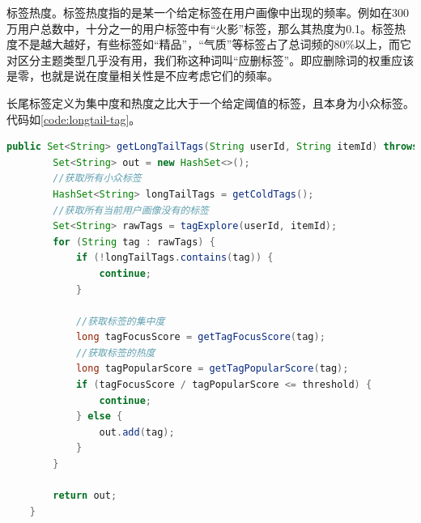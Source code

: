   标签热度。标签热度指的是某一个给定标签在用户画像中出现的频率。例如在300万用户总数中，十分之一的用户标签中有“火影”标签，那么其热度为0.1。标签热度不是越大越好，有些标签如“精品”，“气质”等标签占了总词频的80\%以上，而它对区分主题类型几乎没有用，我们称这种词叫“应删标签”。即应删除词的权重应该是零，也就是说在度量相关性是不应考虑它们的频率。

  长尾标签定义为集中度和热度之比大于一个给定阈值的标签，且本身为小众标签。代码如\autoref{code:longtail-tag}。
  \begin{lstlisting}[language=java,firstnumber=1,label={code:longtail-tag}, caption={长尾标签抽取算法}]
    public Set<String> getLongTailTags(String userId, String itemId) throws Exception {
        Set<String> out = new HashSet<>();
        //获取所有小众标签
        HashSet<String> longTailTags = getColdTags();
        //获取所有当前用户画像没有的标签
        Set<String> rawTags = tagExplore(userId, itemId);
        for (String tag : rawTags) {
            if (!longTailTags.contains(tag)) {
                continue;
            }

            //获取标签的集中度
            long tagFocusScore = getTagFocusScore(tag);
            //获取标签的热度
            long tagPopularScore = getTagPopularScore(tag);
            if (tagFocusScore / tagPopularScore <= threshold) {
                continue;
            } else {
                out.add(tag);
            }
        }

        return out;
    }
  \end{lstlisting}

